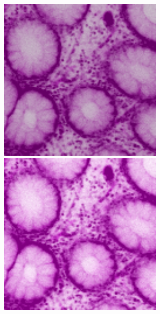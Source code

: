 \begin{figure}[H]
	\centering
	
	\begin{minipage}{0.25\columnwidth}
		\centering
		\includegraphics[clip, width=\linewidth]{fig/preprocessing/data_aug/color/BRIGHTNESS/BRIGHTNESS_0_80}
	\end{minipage}
	\begin{minipage}{0.25\columnwidth}
		\centering
		\includegraphics[clip, width=\linewidth]{fig/preprocessing/data_aug/color/BRIGHTNESS/BRIGHTNESS_1_00}

\end{minipage}
\end{figure}
